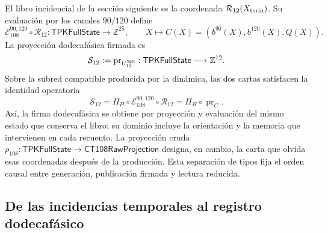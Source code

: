 El libro incidencial de la sección siguiente es la coordenada
\(\mathcal R_{12}(X_{\rm term})\). Su evaluación por los canales
\(90/120\) define
\[
 \mathcal E_{108}^{90,120}\circ\mathcal R_{12}:
 \mathsf{TPKFullState}\longrightarrow\mathbb Z^{25},
 \qquad
 X\longmapsto C(X)=(b^{90}(X),b^{120}(X),Q(X)).
\]
La proyección dodecafásica firmada es
\[
 \mathcal S_{12}:=\operatorname{pr}_{U_{12}^{\rm sgn}}:
 \mathsf{TPKFullState}\longrightarrow\mathbb Z^{12}.
\]
Sobre la subred compatible producida por la dinámica, las dos cartas
satisfacen la identidad operatoria
\begin{equation}
 \mathcal S_{12}
 =\Pi_H\circ\mathcal E_{108}^{90,120}\circ\mathcal R_{12}
 =\Pi_H\circ\operatorname{pr}_{C}.
 \label{vi:dep:identidad-productor-e108}
\end{equation}
Así, la firma dodecafásica se obtiene por proyección y evaluación del mismo
estado que conserva el libro; su dominio incluye la orientación y la memoria
que intervienen en cada recuento. La proyección cruda
\(\rho_{108}:\mathsf{TPKFullState}\to\mathsf{CT108RawProjection}\)
designa, en cambio, la carta que olvida esas coordenadas después de la
producción. Esta separación de tipos fija el orden causal entre generación,
publicación firmada y lectura reducida.

\subsection{De las incidencias temporales al registro dodecafásico}
\label{vi:dep:registro}\label{subsec:k-registro-integral}

